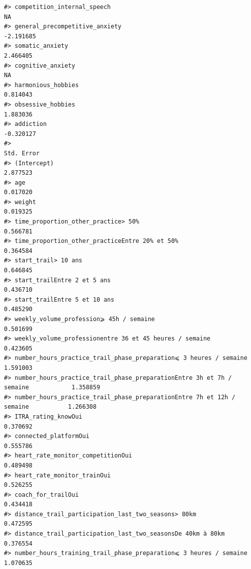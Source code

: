 \documentclass[
]{article}
\begin{document}
\begin{verbatim}
#> competition_internal_speech                                                           NA
#> general_precompetitive_anxiety                                                 -2.191685
#> somatic_anxiety                                                                 2.466405
#> cognitive_anxiety                                                                     NA
#> harmonious_hobbies                                                              0.814043
#> obsessive_hobbies                                                               1.883036
#> addiction                                                                      -0.320127
#>                                                                                Std. Error
#> (Intercept)                                                                      2.877523
#> age                                                                              0.017020
#> weight                                                                           0.019325
#> time_proportion_other_practice> 50%                                              0.566781
#> time_proportion_other_practiceEntre 20% et 50%                                   0.364584
#> start_trail> 10 ans                                                              0.646845
#> start_trailEntre 2 et 5 ans                                                      0.436710
#> start_trailEntre 5 et 10 ans                                                     0.485290
#> weekly_volume_profession⩾ 45h / semaine                                          0.501699
#> weekly_volume_professionentre 36 et 45 heures / semaine                          0.423605
#> number_hours_practice_trail_phase_preparation⩽ 3 heures / semaine                1.591003
#> number_hours_practice_trail_phase_preparationEntre 3h et 7h / semaine            1.358859
#> number_hours_practice_trail_phase_preparationEntre 7h et 12h / semaine           1.266308
#> ITRA_rating_knowOui                                                              0.370692
#> connected_platformOui                                                            0.555786
#> heart_rate_monitor_competitionOui                                                0.489498
#> heart_rate_monitor_trainOui                                                      0.526255
#> coach_for_trailOui                                                               0.434418
#> distance_trail_participation_last_two_seasons> 80km                              0.472595
#> distance_trail_participation_last_two_seasonsDe 40km à 80km                      0.376554
#> number_hours_training_trail_phase_preparation⩽ 3 heures / semaine                1.070635

\end{verbatim}
\end{document}

